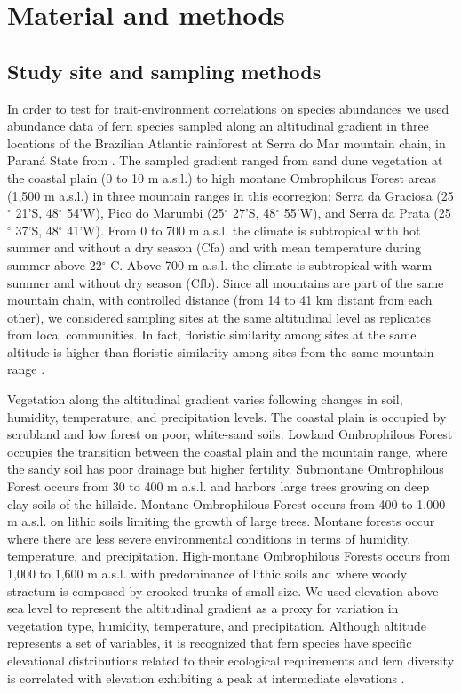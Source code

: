 \documentclass[12pt]{article}
\begin{document}
\section*{Material and methods}

\subsection*{Study site and sampling methods}
In order to test for trait-environment correlations on species abundances we 
used abundance data of fern species sampled along an
altitudinal gradient  in three  
locations of the Brazilian Atlantic rainforest at 
Serra
do Mar mountain chain, in Paran\'a State from \cite{Paciencia2008}.
The sampled gradient ranged from
sand dune vegetation at the coastal plain (0 to 10 m a.s.l.) to high montane 
Ombrophilous Forest areas (1,500 m a.s.l.) in three mountain ranges 
in this ecorregion: 
Serra da 
Graciosa (25{$^{\circ}$} 21'S, 48{$^{\circ}$} 54'W), Pico do Marumbi 
(25{$^{\circ}$} 27'S, 48{$^{\circ}$} 55'W), and Serra da Prata (25{$^{\circ}$} 
37'S, 48{$^{\circ}$} 41'W). From 0 to 700 m a.s.l. the climate is subtropical with hot summer and 
without a dry season (Cfa) and with mean temperature 
during summer above 22{$^{\circ}$} C. Above 700 m a.s.l. the climate is 
subtropical with warm summer and without dry season (Cfb). Since all mountains 
are part of the same mountain chain, with controlled distance (from 14 to 41 km 
distant from each other), we considered sampling sites at the same
altitudinal level as replicates from local communities. 
In fact, floristic similarity among sites at the same altitude is higher than 
floristic similarity among sites from the same mountain range 
\citep{Paciencia2008}. 
 
Vegetation along the altitudinal gradient varies following changes in soil, 
humidity, temperature, and precipitation levels. 
The coastal plain is occupied by scrubland and low forest on poor, white-sand 
soils. 
Lowland Ombrophilous Forest occupies the transition between the coastal plain and 
the mountain range, where the sandy soil has poor drainage but higher fertility. 
Submontane Ombrophilous Forest occurs from 30 to 400 m a.s.l. and harbors large 
trees growing on deep clay soils of the hillside. Montane Ombrophilous Forest occurs 
from 400 to 1,000 m a.s.l. on lithic soils limiting the growth of large 
trees. Montane forests occur where there are less severe environmental 
conditions in terms of humidity, temperature, and precipitation. High-montane 
Ombrophilous Forests occurs from 1,000 to 1,600 m a.s.l. with predominance of 
lithic soils and where woody stractum is composed by crooked trunks of small 
size. 
We used elevation above sea level to represent the altitudinal gradient as a
proxy for variation in vegetation type, humidity, temperature, and
precipitation.  
Although altitude represents a set of variables, it is 
recognized that
fern species have specific elevational distributions related to their
ecological requirements \citep{Mehltreter2010} and fern diversity is correlated with elevation 
exhibiting a peak at intermediate elevations \citep{Kessler2001,Cardelus2006,WatkinsJr2006}. 
\end{document}
